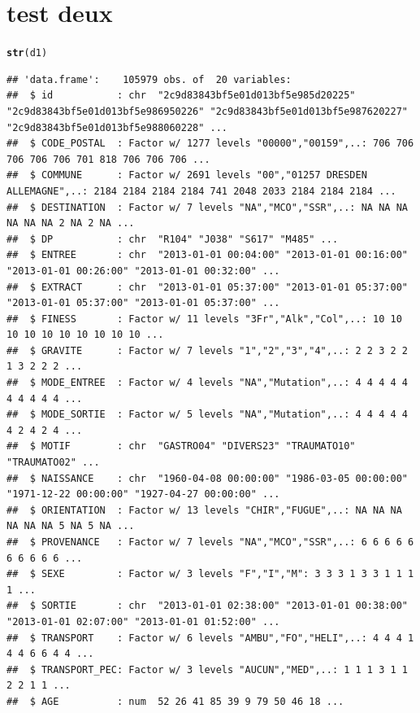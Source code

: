 \documentclass[12pt,english,french]{report}\usepackage{graphicx, color}
\makeatletter
\newcommand{\hlfunctioncall}[1]{\textcolor[rgb]{0.501960784313725,0,0.329411764705882}{\textbf{#1}}}%
\newenvironment{kframe}{%
 \def\at@end@of@kframe{}%
 \ifinner\ifhmode%
  \def\at@end@of@kframe{\end{minipage}}%
  \begin{minipage}{\columnwidth}%
 \fi\fi%
 \def\FrameCommand##1{\hskip\@totalleftmargin \hskip-\fboxsep
 \colorbox{shadecolor}{##1}\hskip-\fboxsep
     \hskip-\linewidth \hskip-\@totalleftmargin \hskip\columnwidth}%
 \MakeFramed {\advance\hsize-\width
   \@totalleftmargin\z@ \linewidth\hsize
   \@setminipage}}%
 {\par\unskip\endMakeFramed%
 \at@end@of@kframe}
\newenvironment{knitrout}{}{} %
\makeatother
\begin{document}
\chapter{test deux}
\begin{knitrout}
\color{fgcolor}\begin{kframe}
\begin{alltt}

\hlfunctioncall{str}(d1)
\end{alltt}
\begin{verbatim}
## 'data.frame':	105979 obs. of  20 variables:
##  $ id           : chr  "2c9d83843bf5e01d013bf5e985d20225" "2c9d83843bf5e01d013bf5e986950226" "2c9d83843bf5e01d013bf5e987620227" "2c9d83843bf5e01d013bf5e988060228" ...
##  $ CODE_POSTAL  : Factor w/ 1277 levels "00000","00159",..: 706 706 706 706 706 701 818 706 706 706 ...
##  $ COMMUNE      : Factor w/ 2691 levels "00","01257 DRESDEN ALLEMAGNE",..: 2184 2184 2184 2184 741 2048 2033 2184 2184 2184 ...
##  $ DESTINATION  : Factor w/ 7 levels "NA","MCO","SSR",..: NA NA NA NA NA NA 2 NA 2 NA ...
##  $ DP           : chr  "R104" "J038" "S617" "M485" ...
##  $ ENTREE       : chr  "2013-01-01 00:04:00" "2013-01-01 00:16:00" "2013-01-01 00:26:00" "2013-01-01 00:32:00" ...
##  $ EXTRACT      : chr  "2013-01-01 05:37:00" "2013-01-01 05:37:00" "2013-01-01 05:37:00" "2013-01-01 05:37:00" ...
##  $ FINESS       : Factor w/ 11 levels "3Fr","Alk","Col",..: 10 10 10 10 10 10 10 10 10 10 ...
##  $ GRAVITE      : Factor w/ 7 levels "1","2","3","4",..: 2 2 3 2 2 1 3 2 2 2 ...
##  $ MODE_ENTREE  : Factor w/ 4 levels "NA","Mutation",..: 4 4 4 4 4 4 4 4 4 4 ...
##  $ MODE_SORTIE  : Factor w/ 5 levels "NA","Mutation",..: 4 4 4 4 4 4 2 4 2 4 ...
##  $ MOTIF        : chr  "GASTRO04" "DIVERS23" "TRAUMATO10" "TRAUMATO02" ...
##  $ NAISSANCE    : chr  "1960-04-08 00:00:00" "1986-03-05 00:00:00" "1971-12-22 00:00:00" "1927-04-27 00:00:00" ...
##  $ ORIENTATION  : Factor w/ 13 levels "CHIR","FUGUE",..: NA NA NA NA NA NA 5 NA 5 NA ...
##  $ PROVENANCE   : Factor w/ 7 levels "NA","MCO","SSR",..: 6 6 6 6 6 6 6 6 6 6 ...
##  $ SEXE         : Factor w/ 3 levels "F","I","M": 3 3 3 1 3 3 1 1 1 1 ...
##  $ SORTIE       : chr  "2013-01-01 02:38:00" "2013-01-01 00:38:00" "2013-01-01 02:07:00" "2013-01-01 01:52:00" ...
##  $ TRANSPORT    : Factor w/ 6 levels "AMBU","FO","HELI",..: 4 4 4 1 4 4 6 6 4 4 ...
##  $ TRANSPORT_PEC: Factor w/ 3 levels "AUCUN","MED",..: 1 1 1 3 1 1 2 2 1 1 ...
##  $ AGE          : num  52 26 41 85 39 9 79 50 46 18 ...
\end{verbatim}

\end{kframe}
\end{knitrout}
\end{document}
